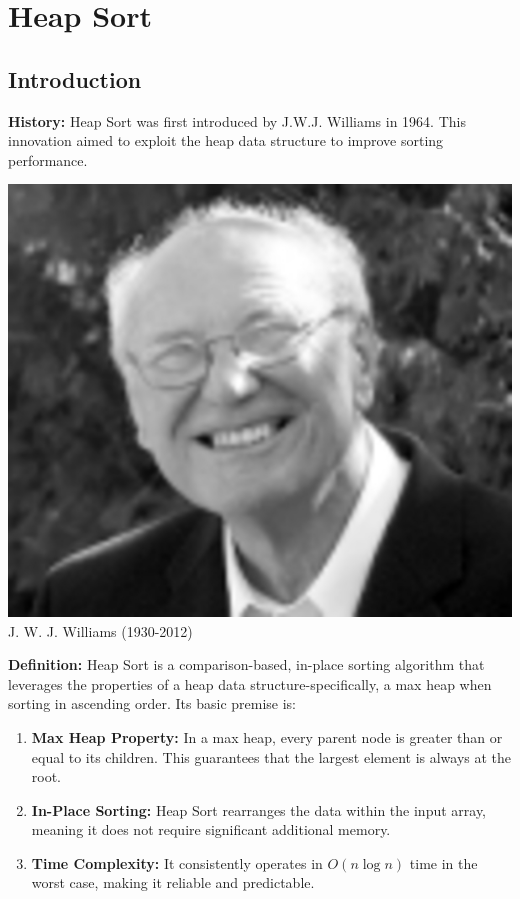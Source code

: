 \section{Heap Sort}

\subsection{Introduction}
\textbf{History:} Heap Sort was first introduced by J.W.J. Williams in 1964. This innovation aimed to exploit the heap data structure to improve sorting performance.

\begin{center}
    \includegraphics[scale=.25]{img/jwjWilliams.jpg}\\
    J. W. J. Williams (1930-2012)
\end{center}

\textbf{Definition:} Heap Sort is a comparison-based, in-place sorting algorithm that leverages the properties of a heap data structure-specifically, a max heap when sorting in ascending order. Its basic premise is:
\begin{enumerate}
    \item \textbf{Max Heap Property:} In a max heap, every parent node is greater than or equal to its children. This guarantees that the largest element is always at the root.
    \item \textbf{In-Place Sorting:} Heap Sort rearranges the data within the input array, meaning it does not require significant additional memory.
    \item \textbf{Time Complexity:} It consistently operates in $O(n \log n)$ time in the worst case, making it reliable and predictable.
\end{enumerate}

